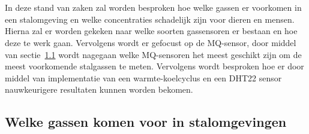 \chapter{}%
\label{ch:stand-van-zaken}



In deze stand van zaken zal worden besproken hoe welke gassen er voorkomen in een stalomgeving en welke concentraties schadelijk zijn voor dieren en mensen. Hierna zal er worden gekeken naar welke soorten gassensoren er bestaan en hoe deze te werk gaan. Vervolgens wordt er gefocust op de MQ-sensor, door middel van sectie~\ref{sec:welke-stalgassen} wordt nagegaan welke MQ-sensoren het meest geschikt zijn om de meest voorkomende stalgassen te meten. Vervolgens wordt besproken hoe er door middel van implementatie van een warmte-koelcyclus en een DHT22 sensor nauwkeurigere resultaten kunnen worden bekomen.


\section{Welke gassen komen voor in stalomgevingen}%
\label{sec:welke-stalgassen}

